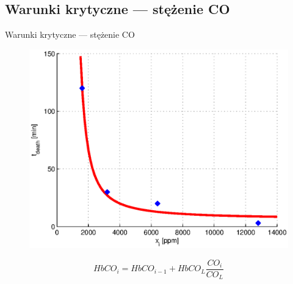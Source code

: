 
\subsection{Warunki krytyczne --- stężenie CO}
\begin{frame}{Warunki krytyczne --- stężenie CO}
  \begin{figure}
    \centering
    \includegraphics[height=0.6\textheight]{wykresy-wiki}
  \end{figure}
  $$HbCO_i = HbCO_{i-1} + HbCO_L \frac{CO_i}{CO_L}$$
\end{frame}